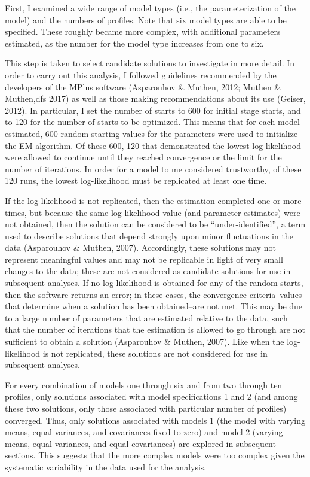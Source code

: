 \documentclass[]{book}
\theoremstyle{definition}
\theoremstyle{definition}
\theoremstyle{definition}
\theoremstyle{remark}
\begin{document}
First, I examined a wide range of model types (i.e., the
parameterization of the model) and the numbers of profiles. Note that
six model types are able to be specified. These roughly became more
complex, with additional parameters estimated, as the number for the
model type increases from one to six.

This step is taken to select candidate solutions to investigate in more
detail. In order to carry out this analysis, I followed guidelines
recommended by the developers of the MPlus software (Asparouhov \&
Muthen, 2012; Muthen \& Muthen,dfs 2017) as well as those making
recommendations about its use (Geiser, 2012). In particular, I set the
number of starts to 600 for initial stage starts, and to 120 for the
number of starts to be optimized. This means that for each model
estimated, 600 random starting values for the parameters were used to
initialize the EM algorithm. Of these 600, 120 that demonstrated the
lowest log-likelihood were allowed to continue until they reached
convergence or the limit for the number of iterations. In order for a
model to me considered trustworthy, of these 120 runs, the lowest
log-likelihood must be replicated at least one time.

If the log-likelihood is not replicated, then the estimation completed
one or more times, but because the same log-likelihood value (and
parameter estimates) were not obtained, then the solution can be
considered to be ``under-identified'', a term used to describe solutions
that depend strongly upon minor fluctuations in the data (Asparouhov \&
Muthen, 2007). Accordingly, these solutions may not represent meaningful
values and may not be replicable in light of very small changes to the
data; these are not considered as candidate solutions for use in
subsequent analyses. If no log-likelihood is obtained for any of the
random starts, then the software returns an error; in these cases, the
convergence criteria--values that determine when a solution has been
obtained--are not met. This may be due to a large number of parameters
that are estimated relative to the data, such that the number of
iterations that the estimation is allowed to go through are not
sufficient to obtain a solution (Asparouhov \& Muthen, 2007). Like when
the log-likelihood is not replicated, these solutions are not considered
for use in subsequent analyses.

For every combination of models one through six and from two through ten
profiles, only solutions associated with model specifications 1 and 2
(and among these two solutions, only those associated with particular
number of profiles) converged. Thus, only solutions associated with
models 1 (the model with varying means, equal variances, and covariances
fixed to zero) and model 2 (varying means, equal variances, and equal
covariances) are explored in subsequent sections. This suggests that the
more complex models were too complex given the systematic variability in
the data used for the analysis.
\end{document}
